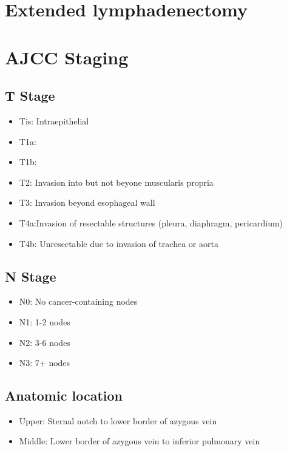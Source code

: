 \documentclass[
]{book}
\providecommand{\tightlist}{%
  \setlength{\itemsep}{0pt}\setlength{\parskip}{0pt}}
\begin{document}
\hypertarget{extended-lymphadenectomy}{%
\section{Extended lymphadenectomy}\label{extended-lymphadenectomy}}

\hypertarget{ajcc-staging}{%
\section{AJCC Staging}\label{ajcc-staging}}

\hypertarget{t-stage}{%
\subsection{T Stage}\label{t-stage}}

\begin{itemize}
\tightlist
\item
  Tis: Intraepithelial
\item
  T1a:
\item
  T1b:
\item
  T2: Invasion into but not beyone muscularis propria
\item
  T3: Invasion beyond esophageal wall
\item
  T4a:Invasion of resectable structures (pleura, diaphragm, pericardium)
\item
  T4b: Unresectable due to invasion of trachea or aorta
\end{itemize}

\hypertarget{n-stage}{%
\subsection{N Stage}\label{n-stage}}

\begin{itemize}
\tightlist
\item
  N0: No cancer-containing nodes
\item
  N1: 1-2 nodes
\item
  N2: 3-6 nodes
\item
  N3: 7+ nodes
\end{itemize}

\hypertarget{anatomic-location}{%
\subsection{Anatomic location}\label{anatomic-location}}

\begin{itemize}
\tightlist
\item
  Upper: Sternal notch to lower border of azygous vein
\item
  Middle: Lower border of azygous vein to inferior pulmonary vein
\end{itemize}
\end{document}
